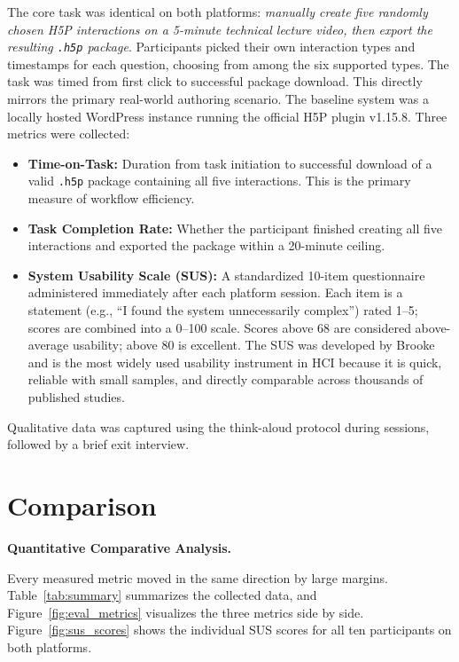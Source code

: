 The core task was identical on both platforms: \emph{manually create five randomly chosen H5P interactions on a 5-minute technical lecture video, then export the resulting \texttt{.h5p} package}. Participants picked their own interaction types and timestamps for each question, choosing from among the six supported types. The task was timed from first click to successful package download. This directly mirrors the primary real-world authoring scenario. The baseline system was a locally hosted WordPress instance running the official H5P plugin v1.15.8.
\clearpage
Three metrics were collected:
\begin{itemize}
    \item \textbf{Time-on-Task:} Duration from task initiation to successful download of a valid \texttt{.h5p} package containing all five interactions. This is the primary measure of workflow efficiency.
    \item \textbf{Task Completion Rate:} Whether the participant finished creating all five interactions and exported the package within a 20-minute ceiling.
    \item \textbf{System Usability Scale (SUS):} A standardized 10-item questionnaire administered immediately after each platform session. Each item is a statement (e.g., ``I found the system unnecessarily complex'') rated 1--5; scores are combined into a 0--100 scale. Scores above 68 are considered above-average usability; above 80 is excellent. The SUS was developed by Brooke~\cite{brooke1996} and is the most widely used usability instrument in HCI because it is quick, reliable with small samples, and directly comparable across thousands of published studies.
\end{itemize}

Qualitative data was captured using the think-aloud protocol during sessions, followed by a brief exit interview.

\section{Comparison}

\textbf{Quantitative Comparative Analysis.}

Every measured metric moved in the same direction by large margins. Table~\ref{tab:summary} summarizes the collected data, and Figure~\ref{fig:eval_metrics} visualizes the three metrics side by side. Figure~\ref{fig:sus_scores} shows the individual SUS scores for all ten participants on both platforms.

